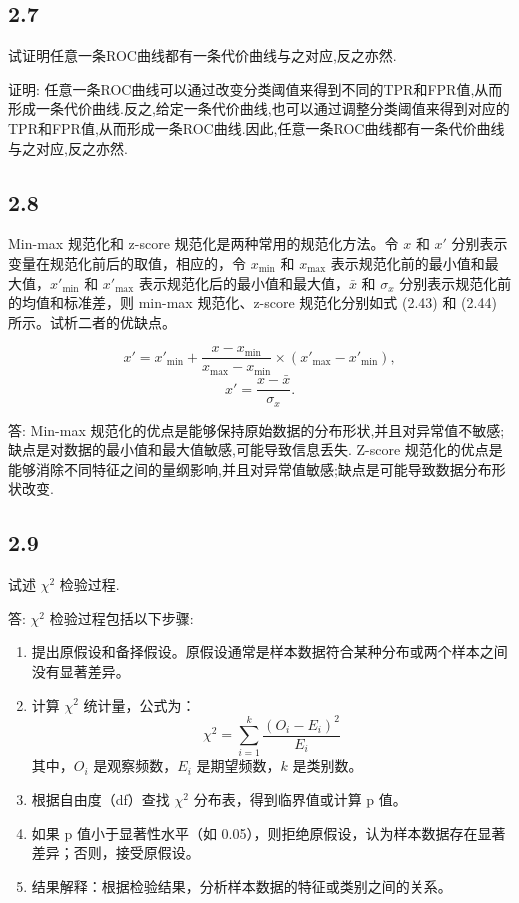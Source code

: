 \subsection*{2.7}
试证明任意一条ROC曲线都有一条代价曲线与之对应,反之亦然.

\par 证明: 任意一条ROC曲线可以通过改变分类阈值来得到不同的TPR和FPR值,从而形成一条代价曲线.反之,给定一条代价曲线,也可以通过调整分类阈值来得到对应的TPR和FPR值,从而形成一条ROC曲线.因此,任意一条ROC曲线都有一条代价曲线与之对应,反之亦然.
\subsection*{2.8}
Min-max 规范化和 z-score 规范化是两种常用的规范化方法。令 \( x \) 和 \( x' \) 分别表示变量在规范化前后的取值，相应的，令 \( x_{\text{min}} \) 和 \( x_{\text{max}} \) 表示规范化前的最小值和最大值，\( x'_{\text{min}} \) 和 \( x'_{\text{max}} \) 表示规范化后的最小值和最大值，\( \bar{x} \) 和 \( \sigma_x \) 分别表示规范化前的均值和标准差，则 min-max 规范化、z-score 规范化分别如式 (2.43) 和 (2.44) 所示。试析二者的优缺点。

\[
x' = x'_{\text{min}} + \frac{x - x_{\text{min}}}{x_{\text{max}} - x_{\text{min}}} \times (x'_{\text{max}} - x'_{\text{min}}),
\]
\[
x' = \frac{x - \bar{x}}{\sigma_x}.
\]

\par 答: Min-max 规范化的优点是能够保持原始数据的分布形状,并且对异常值不敏感;缺点是对数据的最小值和最大值敏感,可能导致信息丢失. Z-score 规范化的优点是能够消除不同特征之间的量纲影响,并且对异常值敏感;缺点是可能导致数据分布形状改变.
\subsection*{2.9}
试述 $\chi^2$ 检验过程.

\par 答: $\chi^2$ 检验过程包括以下步骤:
\begin{enumerate}
    \item 提出原假设和备择假设。原假设通常是样本数据符合某种分布或两个样本之间没有显著差异。
    \item 计算 $\chi^2$ 统计量，公式为：
    \[
    \chi^2 = \sum_{i=1}^{k} \frac{(O_i - E_i)^2}{E_i}
    \]
    其中，$O_i$ 是观察频数，$E_i$ 是期望频数，$k$ 是类别数。
    \item 根据自由度（df）查找 $\chi^2$ 分布表，得到临界值或计算 p 值。
    \item 如果 p 值小于显著性水平（如 0.05），则拒绝原假设，认为样本数据存在显著差异；否则，接受原假设。
    \item 结果解释：根据检验结果，分析样本数据的特征或类别之间的关系。
\end{enumerate}
